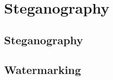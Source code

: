 \documentclass[../../main.tex]{subfiles}
\begin{document}
    \section{Steganography}

    \subsection{Steganography}

    \subsection{Watermarking}

    \pagebreak
\end{document}

